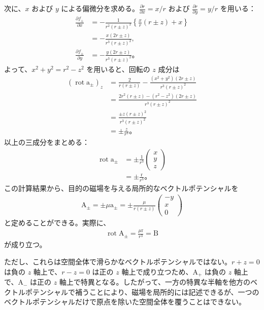 \documentclass[platex,dvipdfmx,a4paper]{jsarticle}
\newcommand{\hb}[2]{\frac{\partial #1}{\partial #2}}
\newcommand{\vect}[1]{\boldsymbol{\mathrm{#1}}}
\begin{document}
次に、\(x\) および \(y\) による偏微分を求める。\(\hb{r}{x}=x/r\) および \(\hb{r}{y}=y/r\) を用いる：
\begin{align*}
  \hb{f_\pm}{x}
  &=-\frac{1}{r^2(r\pm z)^2}
  \left\{\frac{x}{r}(r\pm z)+x\right\}\\
  &=-\frac{x(2r\pm z)}{r^3(r\pm z)^2},\\
  \hb{f_\pm}{y}
  &=-\frac{y(2r\pm z)}{r^3(r\pm z)^2}。
\end{align*}
よって、\(x^2+y^2=r^2-z^2\) を用いると、回転の \(z\) 成分は
\begin{align*}
  (\operatorname{rot}\vect{a}_\pm)_z
  &=\frac{2}{r(r\pm z)}
  -\frac{(x^2+y^2)(2r\pm z)}{r^3(r\pm z)^2}\\
  &=\frac{2r^2(r\pm z)-(r^2-z^2)(2r\pm z)}{r^3(r\pm z)^2}\\
  &=\frac{\pm z(r\pm z)^2}{r^3(r\pm z)^2}\\
  &=\pm\frac{z}{r^3}。
\end{align*}
以上の三成分をまとめる：
\begin{align*}
  \operatorname{rot}\vect{a}_\pm
  &=\pm\frac{1}{r^3}
  \begin{pmatrix}
    x\\
    y\\
    z
  \end{pmatrix}\\
  &=\pm\frac{\vect{r}}{r^3}。
\end{align*}
この計算結果から、目的の磁場を与える局所的なベクトルポテンシャルを
\begin{align*}
  \vect{A}_\pm
  =\pm\mu\vect{a}_\pm
  =\pm\frac{\mu}{r(r\pm z)}
  \begin{pmatrix}
    -y\\
    x\\
    0
  \end{pmatrix}
\end{align*}
と定めることができる。実際に、
\begin{align*}
  \operatorname{rot}\vect{A}_\pm
  =\frac{\mu\vect{r}}{r^3}
  =\vect{B}
\end{align*}
が成り立つ。

ただし、これらは空間全体で滑らかなベクトルポテンシャルではない。\(r+z=0\) は負の \(z\) 軸上で、\(r-z=0\) は正の \(z\) 軸上で成り立つため、\(\vect{A}_+\) は負の \(z\) 軸上で、\(\vect{A}_-\) は正の \(z\) 軸上で特異となる。したがって、一方の特異な半軸を他方のベクトルポテンシャルで補うことにより、磁場を局所的には記述できるが、一つのベクトルポテンシャルだけで原点を除いた空間全体を覆うことはできない。
\end{document}
